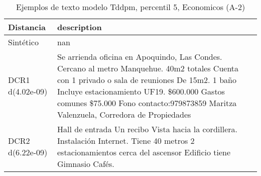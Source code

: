 \begin{table}[H]
\centering
\fontsize{10}{14}\selectfont
\caption{Ejemplos de texto modelo Tddpm, percentil 5, Economicos (A-2)}
\label{table-example-economicos-a-2-tddpm_mlp-5p-text}
\begin{tabular}{|l|m{35em}|}
\hline
\rowcolor[gray]{0.8}
Distancia & description \\
\hline Sintético & nan \\
\hline DCR1 d(4.02e-09) & Se arrienda oficina en Apoquindo, Las Condes. Cercano al metro Manquehue. 40m2 totales Cuenta con 1 privado o sala de reuniones De 15m2. 1 ba\~no Incluye estacionamiento UF19. \$600.000 Gastos comunes \$75.000 Fono contacto:979873859 Maritza Valenzuela, Corredora de Propiedades \\
\hline DCR2 d(6.22e-09) & Hall de entrada 
Un recibo 
Vista hacia la cordillera.
Instalaci\'on Internet. 
Tiene 40 metros 
2 estacionamientos cerca del ascensor 
Edificio tiene 
Gimnasio 
Caf\'es. \\
\hline
\end{tabular}
\end{table}
